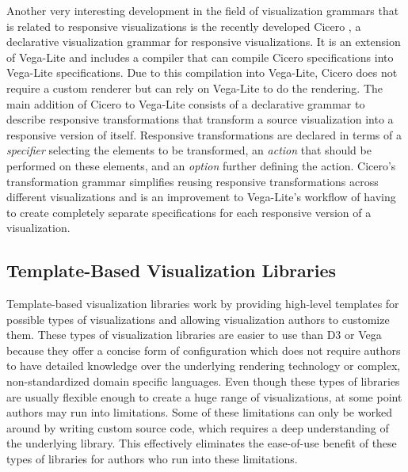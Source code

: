 \begin{samepage}
%
A Vega-Lite specification of the Vega bar chart shown in
Listings~\ref{list:VegaStaticBarChart} and~\ref{list:VegaBarChart}
combined.
},
]{listings/vega-lite-bar-chart.json}
\end{samepage}

Another very interesting development in the field of visualization
grammars that is related to responsive visualizations is the recently
developed Cicero \parencite{Cicero}, a declarative visualization
grammar for responsive visualizations. It is an extension of Vega-Lite
and includes a compiler that can compile Cicero specifications into
Vega-Lite specifications. Due to this compilation into Vega-Lite,
Cicero does not require a custom renderer but can rely on Vega-Lite to
do the rendering. The main addition of Cicero to Vega-Lite consists of
a declarative grammar to describe responsive transformations that
transform a source visualization into a responsive version of itself.
Responsive transformations are declared in terms of a \emph{specifier}
selecting the elements to be transformed, an \emph{action} that should
be performed on these elements, and an \emph{option} further defining
the action. Cicero's transformation grammar simplifies reusing
responsive transformations across different visualizations and is an
improvement to Vega-Lite's workflow of having to create completely
separate specifications for each responsive version of a
visualization. 



\subsection{Template-Based Visualization Libraries}

Template-based visualization libraries work by providing high-level
templates for possible types of visualizations and allowing
visualization authors to customize them. These types of visualization
libraries are easier to use than D3 or Vega because they offer a
concise form of configuration which does not require authors to have
detailed knowledge over the underlying rendering technology or
complex, non-standardized domain specific languages. Even though these
types of libraries are usually flexible enough to create a huge range
of visualizations, at some point authors may run into limitations.
Some of these limitations can only be worked around by writing custom
source code, which requires a deep understanding of the underlying
library. This effectively eliminates the ease-of-use benefit of these
types of libraries for authors who run into these limitations.

